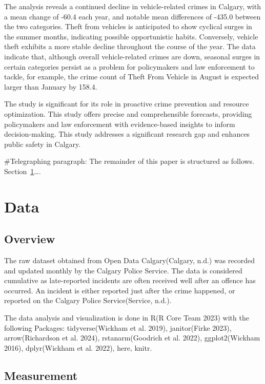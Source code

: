 \documentclass[
  letterpaper,
  DIV=11,
  numbers=noendperiod]{scrartcl}
\begin{document}
The analysis reveals a continued decline in vehicle-related crimes in
Calgary, with a mean change of -60.4 each year, and notable mean
differences of -435.0 between the two categories. Theft from vehicles is
anticipated to show cyclical surges in the summer months, indicating
possible opportunistic habits. Conversely, vehicle theft exhibits a more
stable decline throughout the course of the year. The data indicate
that, although overall vehicle-related crimes are down, seasonal surges
in certain categories persist as a problem for policymakers and law
enforcement to tackle, for example, the crime count of Theft From
Vehicle in August is expected larger than January by 158.4.

The study is significant for its role in proactive crime prevention and
resource optimization. This study offers precise and comprehensible
forecasts, providing policymakers and law enforcement with
evidence-based insights to inform decision-making. This study addresses
a significant research gap and enhances public safety in Calgary.

\#Telegraphing paragraph: The remainder of this paper is structured as
follows. Section~\ref{sec-data}\ldots.

\section{Data}\label{sec-data}

\subsection{Overview}\label{overview}

The raw dataset obtained from Open Data Calgary(Calgary, n.d.) was
recorded and updated monthly by the Calgary Police Service. The data is
considered cumulative as late-reported incidents are often received well
after an offence has occurred. An incident is either reported just after
the crime happened, or reported on the Calgary Police Service(Service,
n.d.).

The data analysis and visualization is done in R(R Core Team 2023) with
the following Packages: tidyverse(Wickham et al. 2019), janitor(Firke
2023), arrow(Richardson et al. 2024), rstanarm(Goodrich et al. 2022),
ggplot2(Wickham 2016), dplyr(Wickham et al. 2022), here, knitr.

\subsection{Measurement}\label{measurement}
\end{document}
